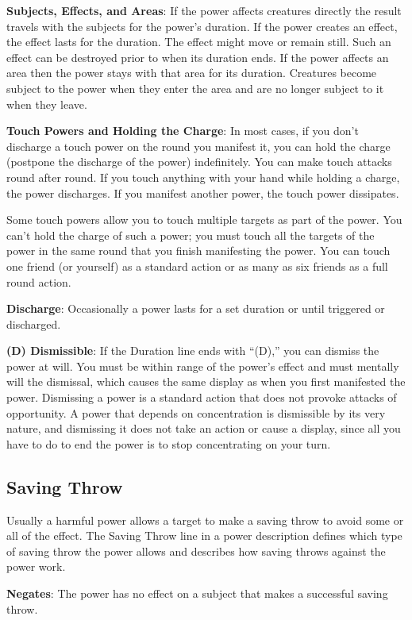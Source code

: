 \textbf{Subjects, Effects, and Areas}: If the power affects creatures directly the result travels with the subjects for the power's duration. If the power creates an effect, the effect lasts for the duration. The effect might move or remain still. Such an effect can be destroyed prior to when its duration ends. If the power affects an area then the power stays with that area for its duration. Creatures become subject to the power when they enter the area and are no longer subject to it when they leave.

\textbf{Touch Powers and Holding the Charge}: In most cases, if you don't discharge a touch power on the round you manifest it, you can hold the charge (postpone the discharge of the power) indefinitely. You can make touch attacks round after round. If you touch anything with your hand while holding a charge, the power discharges. If you manifest another power, the touch power dissipates.

Some touch powers allow you to touch multiple targets as part of the power. You can't hold the charge of such a power; you must touch all the targets of the power in the same round that you finish manifesting the power. You can touch one friend (or yourself) as a standard action or as many as six friends as a full round action.

\textbf{Discharge}: Occasionally a power lasts for a set duration or until triggered or discharged.

\textbf{(D) Dismissible}: If the Duration line ends with ``(D),'' you can dismiss the power at will. You must be within range of the power's effect and must mentally will the dismissal, which causes the same display as when you first manifested the power. Dismissing a power is a standard action that does not provoke attacks of opportunity. A power that depends on concentration is dismissible by its very nature, and dismissing it does not take an action or cause a display, since all you have to do to end the power is to stop concentrating on your turn.

\subsection{Saving Throw}
Usually a harmful power allows a target to make a saving throw to avoid some or all of the effect. The Saving Throw line in a power description defines which type of saving throw the power allows and describes how saving throws against the power work.

\textbf{Negates}: The power has no effect on a subject that makes a successful saving throw.

